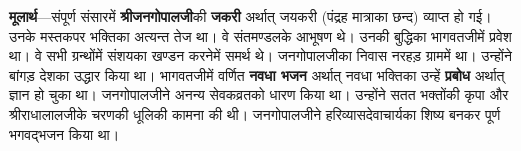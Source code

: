\begin{sloppypar}\justifying{}
\textbf{मूलार्थ}—संपूर्ण संसारमें \textbf{श्रीजनगोपालजी}की \textbf{जकरी} अर्थात् जयकरी (पंद्रह मात्राका छन्द) व्याप्त हो गई। उनके मस्तकपर भक्तिका अत्यन्त तेज था। वे संतमण्डलके आभूषण थे। उनकी बुद्धिका भागवतजीमें प्रवेश था। वे सभी ग्रन्थोंमें संशयका खण्डन करनेमें समर्थ थे। जनगोपालजीका निवास नरहड़ ग्राममें था। उन्होंने बांगड़ देशका उद्धार किया था। भागवतजीमें वर्णित \textbf{नवधा भजन} अर्थात् नवधा भक्तिका उन्हें \textbf{प्रबोध} अर्थात् ज्ञान हो चुका था। जनगोपालजीने अनन्य सेवक\-व्रतको धारण किया था। उन्होंने सतत भक्तोंकी कृपा और श्रीराधालालजीके चरणकी धूलिकी कामना की थी। जनगोपालजीने हरिव्यास\-देवाचार्यका शिष्य बनकर पूर्ण भगवद्भजन किया था।
\end{sloppypar}


